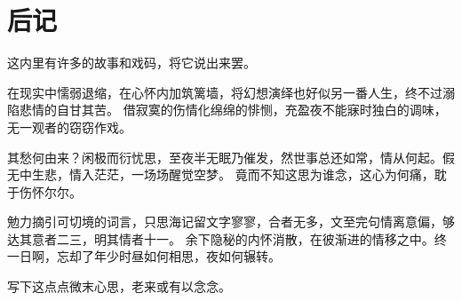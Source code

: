 \part{后记}

\vspace*{2\ccwd}

\hspace*{2em} 这内里有许多的故事和戏码，将它说出来罢。

\vspace*{\ccwd}

\hspace*{2em} 在现实中懦弱退缩，在心怀内加筑篱墙，将幻想演绎也好似另一番人生，终不过溺陷悲情的自甘其苦。
借寂寞的伤情化绵绵的悱恻，充盈夜不能寐时独白的调味，无一观者的窃窃作戏。

\vspace*{\ccwd}

\hspace*{2em} 其愁何由来？闲极而衍忧思，至夜半无眠乃催发，然世事总还如常，情从何起。假无中生悲，情入茫茫，一场场醒觉空梦。
竟而不知这思为谁念，这心为何痛，耽于伤怀尔尔。

\vspace*{\ccwd}

\hspace*{2em} 勉力摘引可切境的词言，只思海记留文字寥寥，合者无多，文至完句情离意偏，够达其意者二三，明其情者十一。
余下隐秘的内怀消散，在彼渐进的情移之中。终一日啊，忘却了年少时昼如何相思，夜如何辗转。

\vspace*{\ccwd}

\hspace*{2em} 写下这点点微末心思，老来或有以念念。

\newpage